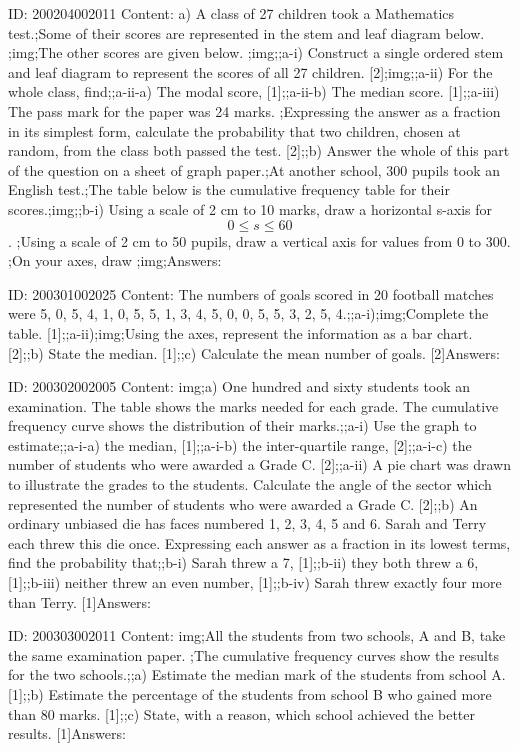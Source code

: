 \documentclass{article}
\begin{document}
ID: 200204002011
Content:
a) A class of 27 children took a Mathematics test.;Some of their scores are represented in the stem and leaf diagram below. ;img;The other scores are given below. ;img;;a-i) Construct a single ordered stem and leaf diagram to represent the scores of all 27 children.   [2];img;;a-ii) For the whole class, find;;a-ii-a) The modal score,   [1];;a-ii-b) The median score.   [1];;a-iii) The pass mark for the paper was 24 marks. ;Expressing the answer as a fraction in its simplest form, calculate the probability that two children, chosen at random, from the class both passed the test.   [2];;b) Answer the whole of this part of the question on a sheet of graph paper.;At another school, 300 pupils took an English test.;The table below is the cumulative frequency table for their scores.;img;;b-i) Using a scale of 2 cm to 10 marks, draw a horizontal s-axis for $$0 \leq s \leq 60$$. ;Using a scale of 2 cm to 50 pupils, draw a vertical axis for values from 0 to 300. ;On your axes, draw ;img;Answers:

ID: 200301002025
Content:
The numbers of goals scored in 20 football matches were 5, 0, 5, 4, 1, 0, 5, 5, 1, 3, 4, 5, 0, 0, 5, 5, 3, 2, 5, 4.;;a-i);img;Complete the table. [1];;a-ii);img;Using the axes, represent the information as a bar chart. [2];;b) State the median. [1];;c) Calculate the mean number of goals. [2]Answers:

ID: 200302002005
Content:
img;a) One hundred and sixty students took an examination. The table shows the marks needed for each grade. The cumulative frequency curve shows the distribution of their marks.;;a-i) Use the graph to estimate;;a-i-a) the median, [1];;a-i-b) the inter-quartile range, [2];;a-i-c) the number of students who were awarded a Grade C. [2];;a-ii) A pie chart was drawn to illustrate the grades to the students. Calculate the angle of the sector which represented the number of students who were awarded a Grade C. [2];;b) An ordinary unbiased die has faces numbered 1, 2, 3, 4, 5 and 6. Sarah and Terry each threw this die once. Expressing each answer as a fraction in its lowest terms, find the probability that;;b-i) Sarah threw a 7, [1];;b-ii) they both threw a 6, [1];;b-iii) neither threw an even number, [1];;b-iv) Sarah threw exactly four more than Terry. [1]Answers:

ID: 200303002011
Content:
img;All the students from two schools, A and B, take the same examination paper. ;The cumulative frequency curves show the results for the two schools.;;a) Estimate the median mark of the students from school A.   [1];;b) Estimate the percentage of the students from school B who gained more than 80 marks.   [1];;c) State, with a reason, which school achieved the better results.   [1]Answers:
\end{document}

